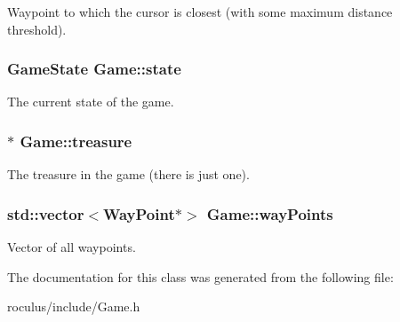 \-Waypoint to which the cursor is closest (with some maximum distance threshold). \hypertarget{classGame_ad9fc2a8710ee56916f79314b91112ed0}{
\subsubsection[{state}]{\setlength{\rightskip}{0pt plus 5cm}\-Game\-State {\bf \-Game\-::state}}}\label{classGame_ad9fc2a8710ee56916f79314b91112ed0}
\-The current state of the game. \hypertarget{classGame_ad13ac2228cd02743a92666aa7ecdf5ea}{
\subsubsection[{treasure}]{$\ast$ {\bf \-Game\-::treasure}}}\label{classGame_ad13ac2228cd02743a92666aa7ecdf5ea}
\-The treasure in the game (there is just one). \hypertarget{classGame_ad8fcb3fbae1a4b604fc243e5e2717909}{
\subsubsection[{way\-Points}]{\setlength{\rightskip}{0pt plus 5cm}std\-::vector$<${\bf \-Way\-Point}$\ast$$>$ {\bf \-Game\-::way\-Points}}}\label{classGame_ad8fcb3fbae1a4b604fc243e5e2717909}
\-Vector of all waypoints. 

\-The documentation for this class was generated from the following file\-:\begin{DoxyCompactItemize}
\item 
roculus/include/\-Game.\-h\end{DoxyCompactItemize}
